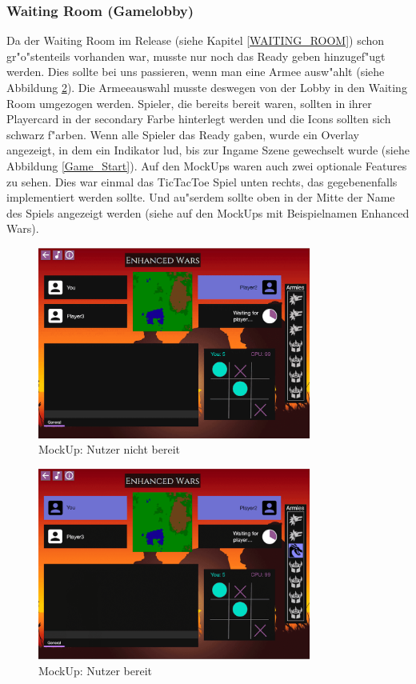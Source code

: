 \documentclass[12pt, titlepage]{scrartcl}
\newcommand{\RN}[1]{%
	\textup{\uppercase\expandafter{\romannumeral#1}}%
}
\begin{document}
		    \subsubsection{Waiting Room (Gamelobby)}
		        Da der Waiting Room im Release \RN{2} (siehe Kapitel \ref{WAITING_ROOM}) schon gr"o"stenteils vorhanden war, musste nur noch das Ready geben hinzugef"ugt werden. Dies sollte bei uns passieren, wenn man eine Armee ausw"ahlt (siehe Abbildung \ref{Ready}). Die Armeeauswahl musste deswegen von der Lobby in den Waiting Room umgezogen werden. Spieler, die bereits bereit waren, sollten in ihrer Playercard in der secondary Farbe hinterlegt werden und die Icons sollten sich schwarz f"arben. Wenn alle Spieler das Ready gaben, wurde ein Overlay angezeigt, in dem ein Indikator lud, bis zur Ingame Szene gewechselt wurde (siehe Abbildung \ref{Game_Start}). Auf den MockUps waren auch zwei optionale Features zu sehen. Dies war einmal das TicTacToe Spiel unten rechts, das gegebenenfalls implementiert werden sollte. Und au"serdem sollte oben in der Mitte der Name des Spiels angezeigt werden (siehe auf den MockUps mit Beispielnamen \glqq Enhanced Wars\grqq). \\
		        \begin{figure}[H] 
    				\centering
    				\includegraphics[width=0.8\textwidth]{images/mockUps/NotReady.png}
    				\caption{MockUp: Nutzer nicht bereit}
    				\label{Not_Ready}
			    \end{figure}
			    \begin{figure}[H] 
    				\centering
    				\includegraphics[width=0.8\textwidth]{images/mockUps/Ready.png}
    				\caption{MockUp: Nutzer bereit}
    				\label{Ready}
			    \end{figure}
\end{document}
